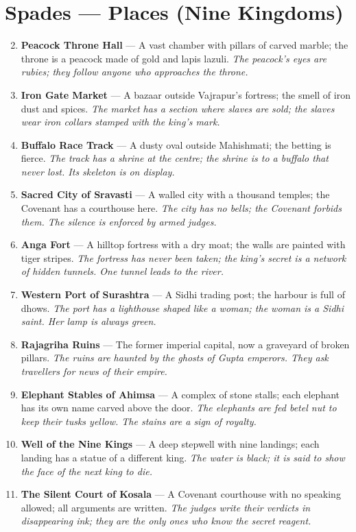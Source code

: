 \documentclass[11pt]{book}
\begin{document}
\section*{Spades — Places (Nine Kingdoms)}
\begin{enumerate}
\setcounter{enumi}{1}
\item \textbf{Peacock Throne Hall} — A vast chamber with pillars of carved marble; the throne is a peacock made of gold and lapis lazuli. \textit{The peacock’s eyes are rubies; they follow anyone who approaches the throne.}
\item \textbf{Iron Gate Market} — A bazaar outside Vajrapur’s fortress; the smell of iron dust and spices. \textit{The market has a section where slaves are sold; the slaves wear iron collars stamped with the king’s mark.}
\item \textbf{Buffalo Race Track} — A dusty oval outside Mahishmati; the betting is fierce. \textit{The track has a shrine at the centre; the shrine is to a buffalo that never lost. Its skeleton is on display.}
\item \textbf{Sacred City of Sravasti} — A walled city with a thousand temples; the Covenant has a courthouse here. \textit{The city has no bells; the Covenant forbids them. The silence is enforced by armed judges.}
\item \textbf{Anga Fort} — A hilltop fortress with a dry moat; the walls are painted with tiger stripes. \textit{The fortress has never been taken; the king’s secret is a network of hidden tunnels. One tunnel leads to the river.}
\item \textbf{Western Port of Surashtra} — A Sidhi trading post; the harbour is full of dhows. \textit{The port has a lighthouse shaped like a woman; the woman is a Sidhi saint. Her lamp is always green.}
\item \textbf{Rajagriha Ruins} — The former imperial capital, now a graveyard of broken pillars. \textit{The ruins are haunted by the ghosts of Gupta emperors. They ask travellers for news of their empire.}
\item \textbf{Elephant Stables of Ahimsa} — A complex of stone stalls; each elephant has its own name carved above the door. \textit{The elephants are fed betel nut to keep their tusks yellow. The stains are a sign of royalty.}
\item \textbf{Well of the Nine Kings} — A deep stepwell with nine landings; each landing has a statue of a different king. \textit{The water is black; it is said to show the face of the next king to die.}
\item[J] \textbf{The Silent Court of Kosala} — A Covenant courthouse with no speaking allowed; all arguments are written. \textit{The judges write their verdicts in disappearing ink; they are the only ones who know the secret reagent.}

\end{enumerate}
\end{document}
